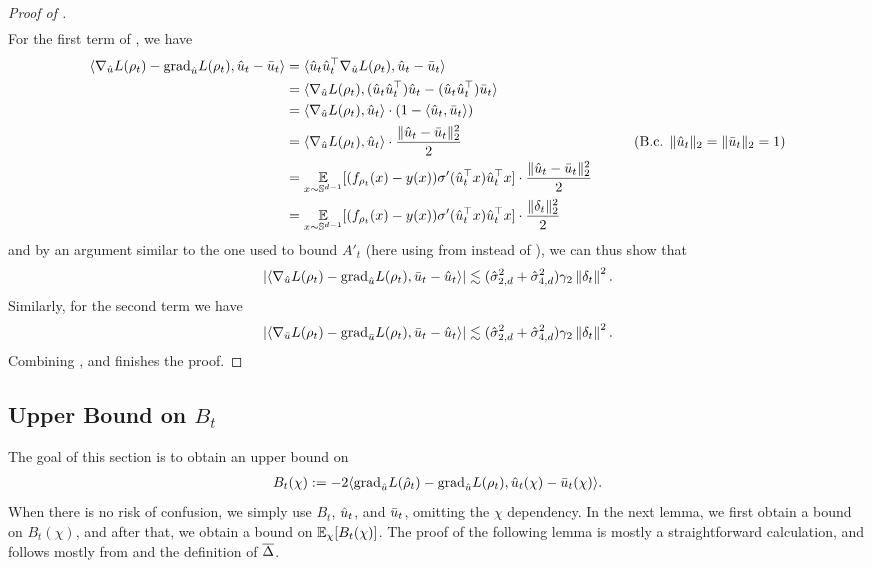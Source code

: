 \begin{proof}[Proof of ]
\begin{align}
    \end{align}
    For the first term of , we have
    \begin{align}
    \langle \nabla_{\uhat} L(\rho_t) - \pgrad_{\uhat} L(\rho_t), \uhat_t - \ubar_t \rangle
    & = \langle \uhat_t \uhat_t^\top \nabla_{\uhat} L(\rho_t), \uhat_t - \ubar_t \rangle \\
    & = \langle \nabla_{\uhat} L(\rho_t), (\uhat_t \uhat_t^\top) \uhat_t - (\uhat_t \uhat_t^\top) \ubar_t \rangle \\
    & = \langle \nabla_{\uhat} L(\rho_t), \uhat_t \rangle \cdot (1 - \langle \uhat_t, \ubar_t \rangle) \\
    & = \langle \nabla_{\uhat} L(\rho_t), \uhat_t \rangle \cdot \frac{\| \uhat_t - \ubar_t \|_2^2}{2}
    & \tag{B.c. $\|\uhat_t\|_2 = \|\ubar_t\|_2 = 1$} \\
    & = \E_{x \sim \bbS^{d - 1}} [(f_{\rho_t}(x) - y(x)) \sigma'(\uhat_t^\top x) \uhat_t^\top x] \cdot \frac{\|\uhat_t - \ubar_t\|_2^2}{2} \\
    & = \E_{x \sim \bbS^{d - 1}} [(f_{\rho_t}(x) - y(x)) \sigma'(\uhat_t^\top x) \uhat_t^\top x] \cdot \frac{\|\delta_t\|_2^2}{2}
    \end{align}
    and by an argument similar to the one used to bound $A'_t$ (here using  from  instead of ), we can thus show that
    \begin{align}
        |\langle \nabla_{\hat{u}} L(\rho_t) - {\textup{grad}}_{\hat{u}} L(\rho_t), \bar{u}_t - \hat{u}_t\rangle| \lesssim (\hat{\sigma}_{2, d}^2+\hat{\sigma}_{4, d}^2)\gamma_2\left\lVert\delta_t\right\rVert^2. \label{eq:at_7}
    \end{align}
    Similarly, for the second term we have
    \begin{align}
        |\langle \nabla_{\bar{u}} L(\rho_t) - {\textup{grad}}_{\bar{u}} L(\rho_t), \bar{u}_t - \hat{u}_t\rangle|\lesssim (\hat{\sigma}_{2, d}^2+\hat{\sigma}_{4, d}^2)\gamma_2\left\lVert\delta_t\right\rVert^2. \label{eq:at_8}
    \end{align}
    Combining ,  and  finishes the proof.
\end{proof}

\subsection{Upper Bound on $B_t$}\label{sec:proof_bt}

The goal of this section is to obtain an upper bound on 
\begin{align}
B_t(\chi) := -2 \langle {\textup{grad}}_{\hat{u}} L({\hat{\rho}}_t) - {\textup{grad}}_{\hat{u}} L(\rho_t), \hat{u}_t(\chi) - \bar{u}_t(\chi) \rangle.
\end{align}
When there is no risk of confusion, we simply use $B_t$, $\hat{u}_t$, and $\bar{u}_t$, omitting the $\chi$ dependency. In the next lemma, we first obtain a bound on $B_t(\chi)$, and after that, we obtain a bound on $\operatorname*{\mathbb{E}}_\chi[B_t(\chi)]$. The proof of the following lemma is mostly a straightforward calculation, and follows mostly from  and the definition of $\overline{\Delta}$.


